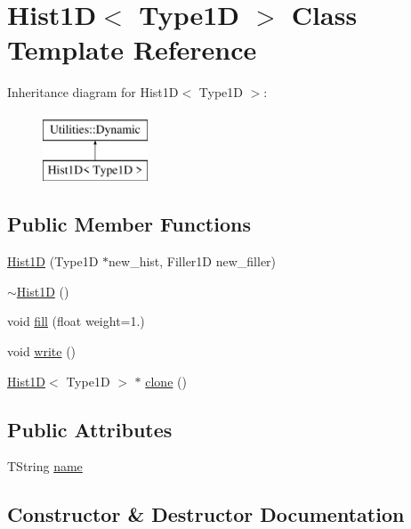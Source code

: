 \hypertarget{classHist1D}{}\section{Hist1D$<$ Type1D $>$ Class Template Reference}
\label{classHist1D}
Inheritance diagram for Hist1D$<$ Type1D $>$\+:\begin{figure}[H]
\begin{center}
\leavevmode
\includegraphics[height=2.000000cm]{classHist1D}
\end{center}
\end{figure}
\subsection*{Public Member Functions}
\begin{DoxyCompactItemize}
\item 
\hyperlink{classHist1D_a76378975401f2dcd3635244ca8614664}{Hist1D} (Type1D $\ast$new\+\_\+hist, Filler1D new\+\_\+filler)
\item 
\hyperlink{classHist1D_a26a713a3b0f55a885fd6f110407990ee}{$\sim$\+Hist1D} ()
\item 
void \hyperlink{classHist1D_af9ae5dd7a2aca46be456dde196db8fba}{fill} (float weight=1.)
\item 
void \hyperlink{classHist1D_ae45c2073b4c8f25a10ac534012feb22b}{write} ()
\item 
\hyperlink{classHist1D}{Hist1D}$<$ Type1D $>$ $\ast$ \hyperlink{classHist1D_a6a35d7957cc8608f61d4605d70407fa6}{clone} ()
\end{DoxyCompactItemize}
\subsection*{Public Attributes}
\begin{DoxyCompactItemize}
\item 
T\+String \hyperlink{classHist1D_a28f350f4fd9e13199ef560ea6820d65c}{name}
\end{DoxyCompactItemize}


\subsection{Constructor \& Destructor Documentation}
